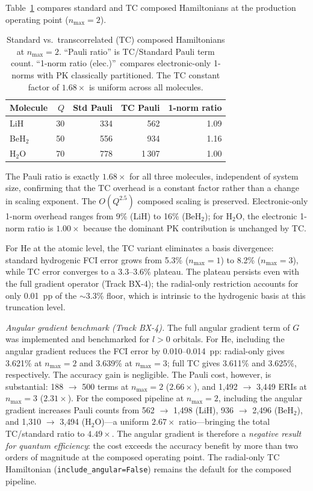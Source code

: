 \documentclass[aps,pra,twocolumn,superscriptaddress,longbibliography]{revtex4-2}
\begin{document}
Table~\ref{tab:tc_composed} compares standard and TC composed
Hamiltonians at the production operating point ($n_{\max} = 2$).

\begin{table}[t]
\caption{Standard vs.\ transcorrelated (TC) composed Hamiltonians
at $n_{\max} = 2$.  ``Pauli ratio'' is TC/Standard Pauli term count.
``1-norm ratio (elec.)''\ compares electronic-only 1-norms with PK
classically partitioned.  The TC constant factor of $1.68\times$ is
uniform across all molecules.}
\label{tab:tc_composed}
\begin{ruledtabular}
\begin{tabular}{lrrrr}
Molecule & $Q$ & {Std Pauli} & {TC Pauli}
  & {1-norm ratio} \\
\hline
LiH    &  30 &    334 &    562 & 1.09 \\
BeH$_2$ &  50 &    556 &    934 & 1.16 \\
H$_2$O  &  70 &    778 & 1\,307 & 1.00 \\
\end{tabular}
\end{ruledtabular}
\end{table}

The Pauli ratio is exactly $1.68\times$ for all three molecules,
independent of system size, confirming that the TC overhead is a
constant factor rather than a change in scaling exponent.  The
$O(Q^{2.5})$ composed scaling is preserved.  Electronic-only
1-norm overhead ranges from 9\% (LiH) to 16\% (BeH$_2$);
for H$_2$O, the electronic 1-norm ratio is $1.00\times$ because
the dominant PK contribution is unchanged by TC.

For He at the atomic level, the TC variant eliminates a basis
divergence: standard hydrogenic FCI error grows from
5.3\% ($n_{\max} = 1$) to 8.2\% ($n_{\max} = 3$), while TC
error converges to a 3.3--3.6\% plateau.  The plateau persists
even with the full gradient operator (Track BX-4); the
radial-only restriction accounts for only 0.01~pp of the
$\sim$3.3\% floor, which is intrinsic to the hydrogenic basis
at this truncation level.

\textit{Angular gradient benchmark (Track BX-4).}
The full angular gradient term of $G$ was implemented and benchmarked
for $l > 0$ orbitals.  For He, including the angular gradient reduces
the FCI error by 0.010--0.014~pp: radial-only gives 3.621\% at
$n_{\max} = 2$ and 3.639\% at $n_{\max} = 3$; full TC gives 3.611\%
and 3.625\%, respectively.  The accuracy gain is negligible.  The
Pauli cost, however, is substantial: 188 $\to$ 500 terms at
$n_{\max} = 2$ ($2.66\times$), and 1{,}492 $\to$ 3{,}449 ERIs at
$n_{\max} = 3$ ($2.31\times$).  For the composed pipeline at
$n_{\max} = 2$, including the angular gradient increases Pauli counts
from 562 $\to$ 1{,}498 (LiH), 936 $\to$ 2{,}496 (BeH$_2$), and
1{,}310 $\to$ 3{,}494 (H$_2$O)---a uniform $2.67\times$ ratio---bringing
the total TC/standard ratio to $4.49\times$.  The angular gradient is
therefore a \emph{negative result for quantum efficiency}: the cost
exceeds the accuracy benefit by more than two orders of magnitude at the
composed operating point.  The radial-only TC Hamiltonian
(\texttt{include\_angular=False}) remains the default for the composed
pipeline.
\end{document}
